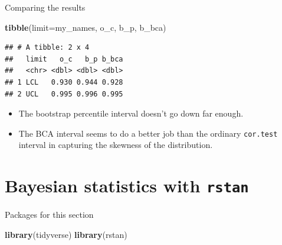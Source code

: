 \documentclass[
  ignorenonframetext,
]{beamer}
\newenvironment{Shaded}{\begin{snugshade}}{\end{snugshade}}
\newcommand{\DataTypeTok}[1]{\textcolor[rgb]{0.13,0.29,0.53}{#1}}
\newcommand{\KeywordTok}[1]{\textcolor[rgb]{0.13,0.29,0.53}{\textbf{#1}}}
\newcommand{\NormalTok}[1]{#1}
\providecommand{\tightlist}{%
  \setlength{\itemsep}{0pt}\setlength{\parskip}{0pt}}
\begin{document}
\begin{frame}[fragile]{Comparing the results}
\protect\hypertarget{comparing-the-results}{}

\begin{Shaded}
\begin{Highlighting}[]
\KeywordTok{tibble}\NormalTok{(}\DataTypeTok{limit=}\NormalTok{my_names, o_c, b_p, b_bca)}
\end{Highlighting}
\end{Shaded}

\begin{verbatim}
## # A tibble: 2 x 4
##   limit   o_c   b_p b_bca
##   <chr> <dbl> <dbl> <dbl>
## 1 LCL   0.930 0.944 0.928
## 2 UCL   0.995 0.996 0.995
\end{verbatim}

\begin{itemize}
\tightlist
\item
  The bootstrap percentile interval doesn't go down far enough.
\item
  The BCA interval seems to do a better job than the ordinary
  \texttt{cor.test} interval in capturing the skewness of the
  distribution.
\end{itemize}

\end{frame}

\hypertarget{bayesian-statistics-with-rstan}{%
\section{\texorpdfstring{Bayesian statistics with
\texttt{rstan}}{Bayesian statistics with rstan}}\label{bayesian-statistics-with-rstan}}

\begin{frame}[fragile]{Packages for this section}
\protect\hypertarget{packages-for-this-section-12}{}

\begin{Shaded}
\begin{Highlighting}[]
\KeywordTok{library}\NormalTok{(tidyverse)}
\KeywordTok{library}\NormalTok{(rstan)}
\end{Highlighting}
\end{Shaded}

\end{frame}
\end{document}
